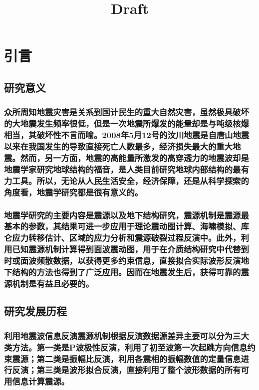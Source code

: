 \documentclass[a4paper,12pt,single,pdftex]{scrartcl}
\title{Draft}
\begin{document}
 
\maketitle
\newpage

\label{ID_492861276}\label{ID_1956039038}\section{引言}

\label{ID_1883815321}\subsection{研究意义}

\label{ID_84459052}\subsubsection{众所周知地震灾害是关系到国计民生的重大自然灾害，虽然极具破坏的大地震发生频率很低，但是一次地震所爆发的能量却是与吨级核爆相当\citep{Stein2003}，其破坏性不言而喻。2008年5月12号的汶川地震是自唐山地震以来在我国发生的导致直接死亡人数最多，经济损失最大的重大地震。然而，另一方面，地震的高能量所激发的高穿透力的地震波却是地震学家研究地球结构的福音，是人类目前研究地球内部结构的最有力工具。所以，无论从人民生活安全，经济保障，还是从科学探索的角度看，地震学研究都是很有意义的。}

\label{ID_219947997}\subsubsection{地震学研究的主要内容是震源以及地下结构研究，震源机制是震源最基本的参数，其结果可进一步应用于理论震动图计算\citep{Wald2005}、海啸模拟\citep{Satake2007}、库仑应力转移估计\citep{King2007}、区域的应力分析和震源破裂过程反演中\citep{Kilb2001}。此外，利用已知震源机制计算得到面波震动图，用于在介质结构研究中代替到时或面波频散数据，以获得更多约束信息，直接拟合实际波形反演地下结构的方法也得到了广泛应用\citep{Nolet1990,Manaman2011,Friederich2003,Zielhuis1994,Cao2001,Lee1997}。因而在地震发生后，获得可靠的震源机制是有益且必要的。}

\label{ID_1577841117}\subsection{研究发展历程}

\label{ID_851024883}\subsubsection{利用地震波信息反演震源机制根据反演数据源差异主要可以分为三大类方法。第一类是P波极性反演，利用了初至波第一次起跳方向信息约束震源；第二类是振幅比反演，利用各震相的振幅数值的定量信息进行反演；第三类是波形拟合反演，直接利用了整个波形数据的所有可用信息计算震源。}
\end{document}
